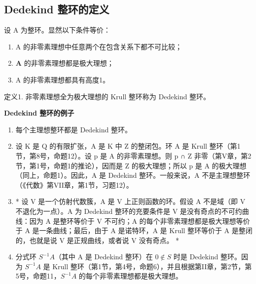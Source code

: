 \subsection{Dedekind 整环的定义}

设 A 为整环。显然以下条件等价：

\begin{enumerate}
\def\labelenumi{(\alph{enumi})}
\item
  A 的非零素理想中任意两个在包含关系下都不可比较；
\item
  \(\mathbf{A}\) 的非零素理想都是极大理想；
\item
  A 的非零素理想都具有高度1。
\end{enumerate}

定义1. 非零素理想全为极大理想的 Krull 整环称为 Dedekind 整环。

\textbf{Dedekind 整环的例子}\par

\begin{enumerate}
\def\labelenumi{(\arabic{enumi})}
\item
  每个主理想整环都是 Dedekind 整环。
\item
  设 K 是 Q 的有限扩张，A 是 K 中 Z 的整闭包。环 A 是 Krull 整环（第1节，第8号，命题12）。设 p 是 A 的非零素理想。则 p ∩ Z 非零（第V章，第2节，第1号，命题1的推论），因而是 Z 的极大理想；所以 p 是 A 的极大理想（同上，命题1）。因此，A 是 Dedekind 整环。一般来说，A 不是主理想整环（《代数》第VII章，第1节，习题12）。
\item
  * 设 V 是一个仿射代数簇，A 是 V 上正则函数的环。假设 A 不是域（即 V 不退化为一点）。A 为 Dedekind 整环的充要条件是 V 是没有奇点的不可约曲线：因为 A 是整环等价于 V 不可约；A 的每个非零素理想都是极大理想等价于 A 是一条曲线；最后，由于 A 是诺特环，A 是 Krull 整环等价于 A 是整闭的，也就是说 V 是正规曲线，或者说 V 没有奇点。 *
\item
  分式环 \(S^{-1}A\)（其中 A 是 Dedekind 整环）在 \(0 \notin S\) 时是 Dedekind 整环。因为 \(S^{-1}A\) 是 Krull 整环（第1节，第4号，命题6），并且根据第II章，第2节，第5号，命题11，\(S^{-1}A\) 的每个非零素理想都是极大理想。
\end{enumerate}

